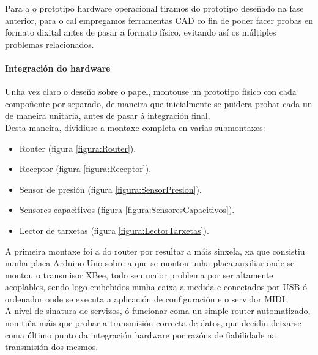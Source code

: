   Para a o prototipo hardware operacional tiramos do prototipo deseñado na fase
  anterior, para o cal empregamos ferramentas CAD co fin de poder facer probas
  en formato dixital antes de pasar a formato físico, evitando así os múltiples
  problemas relacionados.

   \paragraph{Integración do hardware}
   
   Unha vez claro o deseño sobre o papel, montouse un prototipo físico con cada
   compoñente por separado, de maneira que inicialmente se puidera probar cada
   un de maneira unitaria, antes de pasar á integración final. \\
   
   Desta maneira, dividiuse a montaxe completa en varias submontaxes:
   
   \begin{itemize}
    \item Router (figura \ref{figura:Router}).
    \item Receptor (figura \ref{figura:Receptor}).
    \item Sensor de presión (figura \ref{figura:SensorPresion}).
    \item Sensores capacitivos (figura \ref{figura:SensoresCapacitivos}).
    \item Lector de tarxetas (figura \ref{figura:LectorTarxetas}).
   \end{itemize}
   
   A primeira montaxe foi a do router por resultar a máis sinxela, xa que
   consistiu nunha placa Arduino Uno sobre a que se montou unha placa auxiliar
   onde se montou o transmisor XBee, todo sen maior problema por ser altamente
   acoplables, sendo logo embebidos nunha caixa a medida e conectados por USB
   ó ordenador onde se executa a aplicación de configuración e o servidor
   MIDI. \\
   
   A nivel de sinatura de servizos, ó funcionar coma un simple router
   automatizado, non tiña máis que probar a transmisión correcta de datos, que
   decidiu deixarse coma último punto da integración hardware por razóns de
   fiabilidade na transmisión dos mesmos. \\
   

